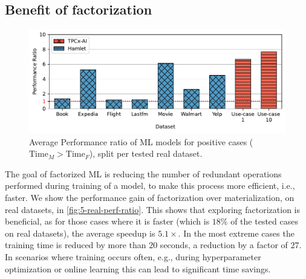 \subsection{Benefit of factorization}
\begin{figure}[ht]
    \centering
    \includegraphics[width=0.7\linewidth]{chapters/05_cost_estimation/figures/real_datasets_speedup.pdf}
    \vspace*{-5mm}
    \caption[Performance gain with factorization on real datasets]{Average Performance ratio of ML models for positive cases ($\text{Time}_M > \text{Time}_F$), split per tested real dataset.}
    \label{fig:5-real-perf-ratio}
\end{figure}

The goal of factorized ML is reducing the number of redundant operations performed during training of a model, to make this process more efficient, i.e., faster. We show the performance gain of factorization over materialization, on real datasets, in \autoref{fig:5-real-perf-ratio}. This shows that exploring factorization is beneficial, as for those cases where it is faster (which is $18\%$ of the tested cases on real datasets), the average speedup is $5.1\times$. In the most extreme cases the training time is reduced by more than $20$ seconds, a reduction by a factor of $27$. In scenarios where training occurs often, e.g., during hyperparameter optimization or online learning this can lead to significant time savings.


